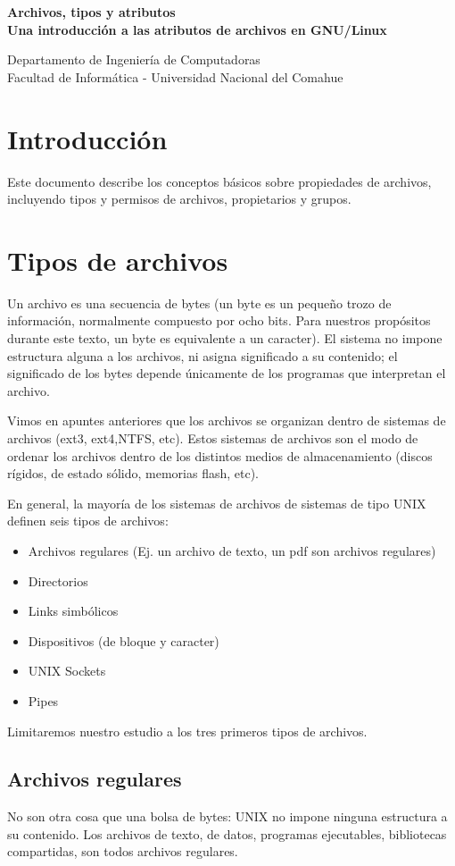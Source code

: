 \documentclass[12pt]{article}
\def\maketitle{

\makeatletter
{\color{bl} \centering \huge \sc \textbf{
Archivos, tipos y atributos \\
\large \vspace*{-8pt} \color{black} Una introducción a las atributos de archivos en GNU/Linux
 \vspace*{8pt} }\par}
 \makeatother


 \makeatletter
 {\centering \small 
 	Departamento de Ingeniería de Computadoras \\
 	Facultad de Informática - Universidad Nacional del Comahue \\
 	\vspace{20pt} }
 \makeatother

}
\begin{document}
\thispagestyle{empty}
\maketitle
\setlength{\parindent}{0pt}


\section*{Introducción}
Este documento describe los conceptos básicos sobre propiedades de archivos, 
incluyendo tipos y permisos de archivos, propietarios y grupos. 

\section*{Tipos de archivos}

Un archivo es una secuencia de bytes (un byte es un pequeño trozo de 
información, normalmente compuesto por ocho bits. Para nuestros propósitos
durante este texto, un byte es equivalente a un caracter). El sistema no impone 
estructura alguna a los archivos, ni asigna significado a su contenido; el 
significado de los bytes depende únicamente de los programas que 
interpretan el archivo. 

Vimos en apuntes anteriores que los archivos se organizan dentro de sistemas de 
archivos (ext3, ext4,NTFS, etc). Estos sistemas de archivos son el modo de 
ordenar los archivos dentro de los distintos medios de almacenamiento (discos
rígidos, de estado sólido, memorias flash, etc). 

En general, la mayoría de los sistemas de archivos de sistemas de tipo UNIX
definen seis tipos de archivos:

\begin{itemize}
\item Archivos regulares (Ej. un archivo de texto, un pdf son archivos regulares)
\item Directorios
\item Links simbólicos
\item Dispositivos (de bloque y caracter) 
\item UNIX Sockets  
\item Pipes 
\end{itemize}

Limitaremos nuestro estudio a los tres primeros tipos de archivos. 


\subsection*{Archivos regulares}
No son otra cosa que una bolsa de bytes: UNIX no impone ninguna estructura a
su contenido. Los archivos de texto, de datos, programas ejecutables, bibliotecas
compartidas, son todos archivos regulares.
\end{document}
